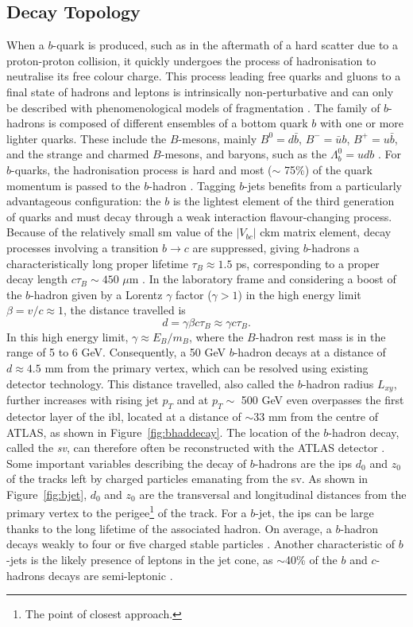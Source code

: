 \subsection{Decay Topology}
When a $b$-quark is produced, such as in the aftermath of a hard scatter due to a proton-proton collision, it quickly undergoes the process of hadronisation to neutralise its free colour charge. This process leading free quarks and gluons to a final state of hadrons and leptons is intrinsically non-perturbative and can only be described with phenomenological models of fragmentation \cite{Webber:419784}. The family of $b$-hadrons is composed of different ensembles of a bottom quark $b$ with one or more lighter quarks. These include the $B$-mesons, mainly $B^0=d\bar{b}$, $B^-=\bar{u}b$, $B^+=u\bar{b}$, and the strange and charmed $B$-mesons, and baryons, such as the $\Lambda_b^0=udb$ \cite{ATL-PHYS-PUB-2014-008}. For $b$-quarks, the hadronisation process is hard and most ($\sim$ 75\%) of the quark momentum is passed to the $b$-hadron \cite{Webber:419784}. Tagging $b$-jets benefits from a particularly advantageous configuration: the $b$ is the lightest element of the third generation of quarks and must decay through a weak interaction flavour-changing process. Because of the relatively small \gls{sm} value of the $|V_{bc}|$ \gls{ckm} matrix element, decay processes involving a transition $b \rightarrow c$ are suppressed, giving $b$-hadrons a characteristically long proper lifetime $\tau_B \approx 1.5$ ps, corresponding to a proper decay length $c\tau_{B} \sim 450$ $\mu$m \cite{Tanabashi:2018oca}. In the laboratory frame and considering a boost of the $b$-hadron given by a Lorentz $\gamma$ factor ($\gamma > 1$) in the high energy limit $\beta = v/c \approx 1$, the distance travelled is \[d = \gamma \beta c \tau_B \approx \gamma c \tau_B.\] In this high energy limit, $\gamma \approx E_B / m_B$, where the $B$-hadron rest mass is in the range of 5 to 6 GeV. Consequently, a 50 GeV $b$-hadron decays at a distance of $d \approx 4.5$ mm from the primary vertex, which can be resolved using existing detector technology. This distance travelled, also called the $b$-hadron radius $L_{xy}$, further increases with rising jet $p_T$ and at $p_T \sim$ 500 GeV even overpasses the first detector layer of the \gls{ibl}, located at a distance of $\sim$33 mm from the centre of ATLAS, as shown in Figure~\ref{fig:bhaddecay}. The location of the $b$-hadron decay, called the \textit{\gls{sv}}, can therefore often be reconstructed with the ATLAS detector \cite{Aad:2019aic}. Some important variables describing the decay of $b$-hadrons are the \glspl{ip} $d_0$ and $z_0$ of the tracks left by charged particles emanating from the \gls{sv}. As shown in Figure~\ref{fig:bjet}, $d_0$ and $z_0$ are the transversal and longitudinal distances from the primary vertex to the perigee\footnote{The point of closest approach.} of the track. For a $b$-jet, the \glspl{ip} can be large thanks to the long lifetime of the associated hadron. On average, a $b$-hadron decays weakly to four or five charged stable particles \cite{ATL-PHYS-PUB-2014-008}. Another characteristic of $b$-jets is the likely presence of leptons in the jet cone, as $\sim$40\% of the $b$ and $c$-hadrons decays are semi-leptonic \cite{Tanabashi:2018oca}. \\
